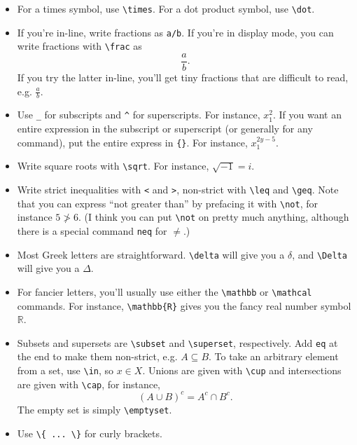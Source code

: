 \documentclass[12pt]{article}
\begin{document}
	\begin{itemize}
		\item For a times symbol, use \verb|\times|. For a dot product symbol, 
		use \verb|\dot|. 
		
		\item If you're in-line, write fractions as \verb|a/b|. If you're in display 
		mode, you can write fractions with \verb|\frac| as
			\[ \frac{a}{b}. \]
		If you try the latter in-line, you'll get tiny fractions that are difficult to 
		read, e.g. $\frac{a}{b}$. 
		
		\item Use \verb|_| for subscripts and \verb|^| for superscripts. For 
		instance, $x_1^2$. If you want an entire expression in the subscript 
		or superscript (or generally for any command), put the entire express
		in \verb|{}|. For instance, $x_1^{2y-5}$. 
		
		\item Write square roots with \verb|\sqrt|. For instance, $\sqrt{-1}=i$. 
		
		\item Write strict inequalities with \verb|<| and \verb|>|, non-strict 
		with \verb|\leq| and \verb|\geq|. Note that you can express ``not 
		greater than'' by prefacing it with  \verb|\not|, for instance $5 \not > 6$. 
		(I think you can put \verb|\not| on pretty much anything, although there 
		is a special command \verb|neq| for $\neq$.)
		
		\item Most Greek letters are straightforward. \verb|\delta| will give you a
		$\delta$, and \verb|\Delta| will give you a $\Delta$. 
		
		\item For fancier letters, you'll usually use either the \verb|\mathbb| or 
		\verb|\mathcal| commands. For instance, \verb|\mathbb{R}| gives you
		the fancy real number symbol $\mathbb{R}$.
		
		\item Subsets and supersets are \verb|\subset| and \verb|\superset|, 
		respectively. Add \verb|eq| at the end to make them non-strict, e.g. 
		$A \subseteq B$. To take an arbitrary element from a set, use \verb|\in|, 
		so $x \in X$. Unions are given with \verb|\cup| and intersections are given 
		with \verb|\cap|, for instance,  
			\[	(A \cup B)^c=A^c \cap B^c . \]
		The empty set is simply \verb|\emptyset|. 
		
		\item Use \verb|\{ ... \}| for curly brackets. 
		

\end{itemize}
\end{document}
